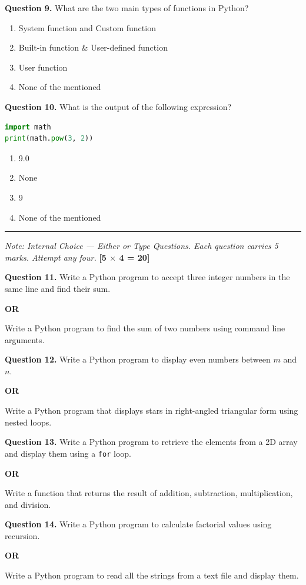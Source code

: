 \documentclass[11pt,a4paper]{article}
\begin{document}
\medskip\noindent\textbf{Question 9.} What are the two main types of functions in Python?
\begin{enumerate}[label=(\alph*),itemsep=2pt]
  \item System function and Custom function
  \item Built-in function \& User-defined function
  \item User function
  \item None of the mentioned
\end{enumerate}

\medskip\noindent\textbf{Question 10.} What is the output of the following expression?
\begin{lstlisting}[language=Python]
import math
print(math.pow(3, 2))
\end{lstlisting}
\begin{enumerate}[label=(\alph*),itemsep=2pt]
  \item 9.0
  \item None
  \item 9
  \item None of the mentioned
\end{enumerate}

\bigskip{}
\rule{\linewidth}{0.4pt}\smallskip

\noindent\textit{Note: Internal Choice --- Either or Type Questions. Each question carries 5 marks. Attempt any four.} \hfill \textbf{[5 $\times$ 4 = 20]}

\medskip\noindent\textbf{Question 11.} Write a Python program to accept three integer numbers in the same line and find their sum.
\centerline{\textbf{OR}}
Write a Python program to find the sum of two numbers using command line arguments.

\medskip\noindent\textbf{Question 12.} Write a Python program to display even numbers between $m$ and $n$.
\centerline{\textbf{OR}}
Write a Python program that displays stars in right-angled triangular form using nested loops.

\medskip\noindent\textbf{Question 13.} Write a Python program to retrieve the elements from a 2D array and display them using a \texttt{for} loop.
\centerline{\textbf{OR}}
Write a function that returns the result of addition, subtraction, multiplication, and division.

\medskip\noindent\textbf{Question 14.} Write a Python program to calculate factorial values using recursion.
\centerline{\textbf{OR}}
Write a Python program to read all the strings from a text file and display them.
\end{document}
